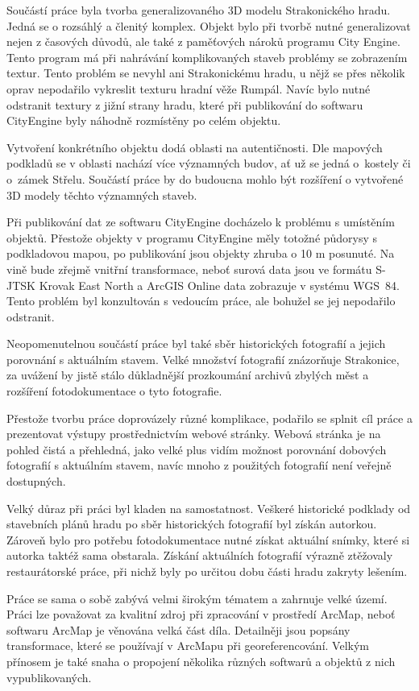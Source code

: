 \documentclass[thesis=M,czech]{FITthesis}[2012/06/26]
\begin{document}
Součástí práce byla tvorba generalizovaného 3D modelu Strakonického hradu. Jedná se o rozsáhlý a členitý komplex. Objekt bylo při tvorbě nutné generalizovat nejen z časových důvodů, ale také z paměťových nároků programu City Engine. Tento program má při nahrávání komplikovaných staveb problémy se zobrazením textur. Tento problém se nevyhl ani Strakonickému hradu, u nějž se přes několik oprav nepodařilo vykreslit texturu hradní věže Rumpál. Navíc bylo nutné odstranit textury z jižní strany hradu, které při publikování do softwaru CityEngine byly náhodně rozmístěny po celém objektu.

Vytvoření konkrétního objektu dodá oblasti na autentičnosti. Dle mapových podkladů se v oblasti nachází více významných budov, ať už se jedná o~kostely či o~zámek Střelu. Součástí práce by do budoucna mohlo být rozšíření o vytvořené 3D modely těchto významných staveb. 

Při publikování dat ze softwaru CityEngine docházelo k problému s umístěním objektů. Přestože objekty v programu CityEngine měly totožné půdorysy s podkladovou  mapou, po publikování jsou objekty zhruba o 10 m posunuté. Na vině bude zřejmě vnitřní transformace, neboť surová data jsou ve formátu S-JTSK Krovak East North a ArcGIS Online data zobrazuje v systému WGS~84. Tento problém byl konzultován s vedoucím práce, ale bohužel se jej nepodařilo odstranit. 

Neopomenutelnou součástí práce byl také sběr historických fotografií a jejich porovnání s aktuálním stavem. Velké množství fotografií znázorňuje Strakonice, za uvážení by jistě stálo důkladnější prozkoumání archivů zbylých měst a rozšíření fotodokumentace o tyto fotografie. 

Přestože tvorbu práce doprovázely různé komplikace, podařilo se splnit cíl práce a prezentovat výstupy prostřednictvím webové stránky. Webová stránka je na pohled čistá a přehledná, jako velké plus vidím možnost porovnání dobových fotografií s aktuálním stavem, navíc mnoho z použitých fotografií není veřejně dostupných. 

Velký důraz při práci byl kladen na samostatnost. Veškeré historické podklady od stavebních plánů hradu po sběr historických fotografií byl získán autorkou. Zároveň bylo pro potřebu fotodokumentace nutné získat aktuální snímky, které si autorka taktéž sama obstarala. Získání aktuálních fotografií výrazně ztěžovaly restaurátorské práce, při nichž byly po určitou dobu části hradu zakryty lešením. 

Práce se sama o sobě zabývá velmi širokým tématem a zahrnuje velké území. Práci lze považovat za kvalitní zdroj při zpracování v prostředí ArcMap, neboť softwaru ArcMap je věnována velká část díla. Detailněji jsou popsány transformace, které se používají v ArcMapu při georeferencování. Velkým přínosem je také snaha o propojení několika různých softwarů a objektů z nich vypublikovaných.
\end{document}
